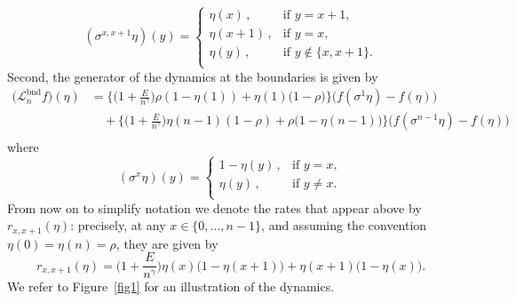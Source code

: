 \documentclass[AHL,Unicode,longabstracts]{cedram}
\newcommand{\mc}[1]{{\mathcal #1}}
\renewcommand{\mc}[1]{{\mathcal #1}}
\begin{document}
\[
(\sigma^{x,x+1} \eta)(y)=
\begin{cases}
\eta(x)\,,& \text{if } y=x+1,\\
\eta(x+1)\,,& \text{if } y=x,\\
\eta(y)\,,& \text{if } y\notin \{x,x+1\}.\\
\end{cases}
\]
Second, the generator of the dynamics at the boundaries is given by
\begin{equation*}
\begin{split}
\big(\mc L_n^{\mathrm{bnd}} f\big)(\eta) & =
\bigg\{\bigg(1+\frac{E}{n^\gamma} \bigg) \rho(1-\eta(1))+\eta(1)\big(1-\rho\big)\bigg\}\big(f(\sigma^{1}\eta) -f(\eta)\big)\\
&\quad +
\bigg\{\bigg(1+\frac{E}{n^\gamma} \bigg) \eta(n-1)(1-\rho)+\rho\big(1-\eta(n-1)\big)\bigg\}\big(f(\sigma^{n-1}\eta) -f(\eta)\big)\\
\end{split}
\end{equation*}
where
\[
(\sigma^{x} \eta)(y)=
\begin{cases}
1-\eta(y)\,,& \text{if } y=x,\\
\eta(y)\,,& \text{if } y\neq x.\\
\end{cases}
\]
From now on to simplify notation we denote the rates that appear above by $r_{x,x+1}(\eta)$: precisely, at any $x\in\{0,\dots,n-1\}$, and assuming the convention $\eta(0)=\eta(n)=\rho$, they are given by
\begin{equation}\label{eq:rate}
r_{x,x+1}(\eta)=\bigg(1+\frac{E}{n^\gamma} \bigg) \eta(x)\big(1-\eta(x+1)\big)+\eta(x+1)\big(1-\eta(x)\big).
\end{equation}
We refer to Figure~\ref{fig1} for an illustration of the dynamics.
\end{document}
